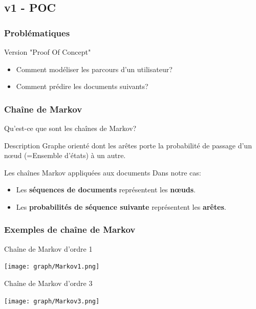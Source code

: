 \documentclass{beamer}
\begin{document}
        \subsection{v1 - POC}
            \begin{frame}
                \frametitle{Problématiques}
                Version "Proof Of Concept"
                \begin{itemize}
                    \pause
                    \item Comment modéliser les parcours d'un utilisateur?
                    \pause
                    \item Comment prédire les documents suivants?
                \end{itemize}
            \end{frame}
            \begin{frame}
                \frametitle{Chaîne de Markov}
                Qu'est-ce que sont les chaînes de Markov?
                \pause
                \begin{block}{Description}
                    Graphe orienté dont les arêtes porte la probabilité de passage d'un nœud (=Ensemble d'états) à un autre.
                \end{block}
                \pause
                \begin{block}{Les chaînes Markov appliquées aux documents}
                    Dans notre cas:
                    \begin{itemize}
                        \item Les \textbf{séquences de documents} représentent les \textbf{nœuds}.
                        \item Les \textbf{probabilités de séquence suivante} représentent les \textbf{arêtes}.
                    \end{itemize}
                \end{block}
            \end{frame}
            \begin{frame}
                \frametitle{Exemples de chaîne de Markov}
                \pause
                \begin{exampleblock}{Chaîne de Markov d'ordre 1}
                    \begin{center}
                        \texttt{[image: graph/Markov1.png]}
                    \end{center}
                \end{exampleblock}
                \pause
                \begin{exampleblock}{Chaîne de Markov d'ordre 3}
                    \begin{center}
                        \texttt{[image: graph/Markov3.png]}
                    \end{center}
                \end{exampleblock}
            \end{frame}
\end{document}
